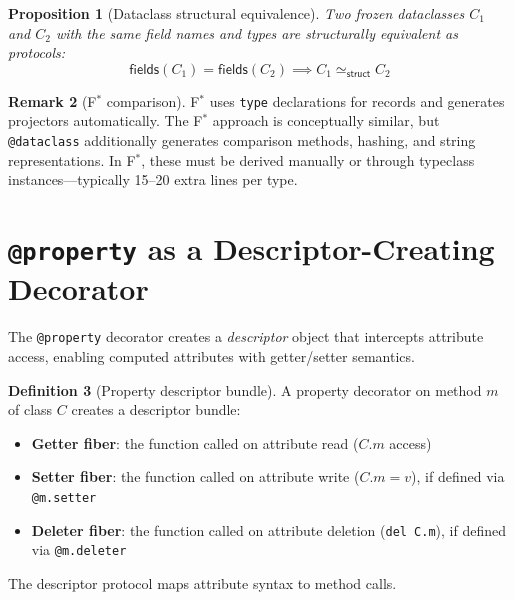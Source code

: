 \documentclass[11pt,a4paper]{report}
\theoremstyle{definition}
\newtheorem{definition}{Definition}[chapter]
\newtheorem{remark}[definition]{Remark}
\theoremstyle{plain}
\newtheorem{proposition}[definition]{Proposition}
\newcommand{\fstar}{F$^{*}$}
\begin{document}
\begin{proposition}[Dataclass structural equivalence]
\label{prop:dc-equiv}
Two frozen dataclasses $C_1$ and $C_2$ with the same field names and types
are structurally equivalent as protocols:
\[
  \mathsf{fields}(C_1) = \mathsf{fields}(C_2) \implies
  C_1 \simeq_{\mathsf{struct}} C_2
\]
\end{proposition}

\begin{remark}[\fstar{} comparison]
\fstar{} uses \lstinline[style=fstar]|type| declarations for records and
generates projectors automatically. The \fstar{} approach is conceptually
similar, but \texttt{@dataclass} additionally generates comparison methods,
hashing, and string representations. In \fstar{}, these must be derived
manually or through typeclass instances---typically 15--20 extra lines per type.
\end{remark}


\section{\texttt{@property} as a Descriptor-Creating Decorator}
\label{sec:property}

The \texttt{@property} decorator creates a \emph{descriptor} object that
intercepts attribute access, enabling computed attributes with getter/setter
semantics.

\begin{definition}[Property descriptor bundle]
A property decorator on method $m$ of class $C$ creates a descriptor bundle:
\begin{itemize}
  \item \textbf{Getter fiber}: the function called on attribute read ($C.m$ access)
  \item \textbf{Setter fiber}: the function called on attribute write ($C.m = v$),
    if defined via \texttt{@m.setter}
  \item \textbf{Deleter fiber}: the function called on attribute deletion
    (\texttt{del C.m}), if defined via \texttt{@m.deleter}
\end{itemize}
The descriptor protocol maps attribute syntax to method calls.
\end{definition}
\end{document}
